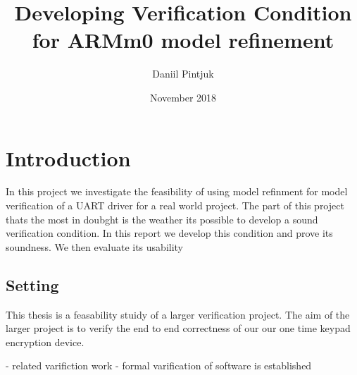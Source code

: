 \usepackage[utf8]{inputenc}

\title{Developing Verification Condition for ARMm0 model refinement}
\author{Daniil Pintjuk}
\date{November 2018}

\usepackage{natbib}
\usepackage{graphicx}



\maketitle

\section{Introduction}
In this project we investigate the feasibility of using model refinment for model verification of a UART driver for a real world project. The part of this project thats the most in doubght is the weather its possible to develop a sound verification condition. In this report we develop this condition and prove its soundness. We then evaluate its usability 



\subsection{Setting}
This thesis is a feasability stuidy of a larger verification project. The aim of the larger project is to verify the end to end correctness of our our one time keypad encryption device.

- related varifiction work
- formal varification of software is established

